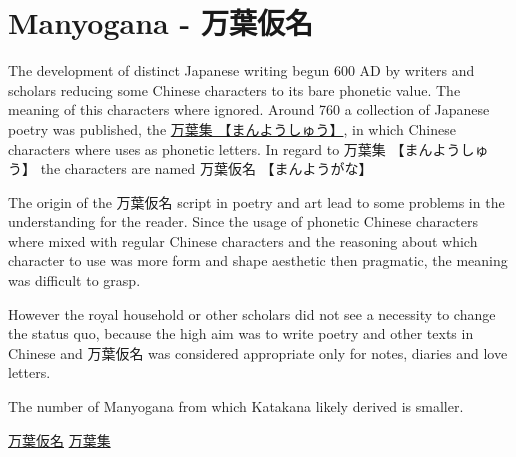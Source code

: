 \section{Manyogana - 万葉仮名} \label{sec:Manyogana}

The development of distinct Japanese writing begun 600 AD by writers and
scholars reducing some Chinese characters to its bare phonetic value. The
meaning of this characters where ignored. Around 760 a collection of Japanese
poetry was published, the \Link
\href{http://en.wikipedia.org/wiki/Man%27y%C5%8Dsh%C5%AB}{万葉集
【まんようしゅう】}, in which Chinese characters where uses as phonetic
letters. In regard to {万葉集} {【まんようしゅう】} the characters are named
{万葉仮名} {【まんようがな】}

The origin of the {万葉仮名} script in poetry and art lead to some problems in
the understanding for the reader. Since the usage of phonetic Chinese
characters where mixed with regular Chinese characters and the reasoning about
which character to use was more form and shape aesthetic then pragmatic, the
meaning was difficult to grasp.

However the royal household or other scholars did not see a necessity to change
the status quo, because the high aim was to write poetry and other texts in
Chinese and {万葉仮名} was considered appropriate only for notes, diaries and
love letters.


The number of Manyogana from which Katakana likely derived is smaller.  



\Link \href{http://en.wikipedia.org/wiki/Manyogana}{万葉仮名}
\Link \href{http://en.wikipedia.org/wiki/Man%27y%C5%8Dsh%C5%AB}{万葉集}

